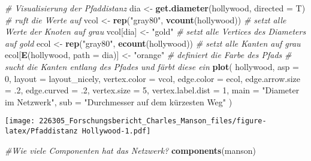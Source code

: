 \documentclass[
]{article}
\newenvironment{Shaded}{\begin{snugshade}}{\end{snugshade}}
\newcommand{\CommentTok}[1]{\textcolor[rgb]{0.56,0.35,0.01}{\textit{#1}}}
\newcommand{\DataTypeTok}[1]{\textcolor[rgb]{0.13,0.29,0.53}{#1}}
\newcommand{\DecValTok}[1]{\textcolor[rgb]{0.00,0.00,0.81}{#1}}
\newcommand{\FloatTok}[1]{\textcolor[rgb]{0.00,0.00,0.81}{#1}}
\newcommand{\KeywordTok}[1]{\textcolor[rgb]{0.13,0.29,0.53}{\textbf{#1}}}
\newcommand{\NormalTok}[1]{#1}
\newcommand{\StringTok}[1]{\textcolor[rgb]{0.31,0.60,0.02}{#1}}
\begin{document}
\begin{Shaded}
\begin{Highlighting}[]
\CommentTok{# Visualisierung der Pfaddistanz}
\NormalTok{dia <-}\StringTok{ }\KeywordTok{get.diameter}\NormalTok{(hollywood, }\DataTypeTok{directed =}\NormalTok{ T) }\CommentTok{# ruft die Werte auf}
\NormalTok{vcol <-}
\StringTok{  }\KeywordTok{rep}\NormalTok{(}\StringTok{"gray80"}\NormalTok{, }\KeywordTok{vcount}\NormalTok{(hollywood)) }\CommentTok{# setzt alle Werte der Knoten auf grau}
\NormalTok{vcol[dia] <-}\StringTok{ "gold"} \CommentTok{# setzt alle Vertices des Diameters auf gold}
\NormalTok{ecol <-}
\StringTok{  }\KeywordTok{rep}\NormalTok{(}\StringTok{"gray80"}\NormalTok{, }\KeywordTok{ecount}\NormalTok{(hollywood)) }\CommentTok{# setzt alle Kanten auf grau}
\NormalTok{ecol[}\KeywordTok{E}\NormalTok{(hollywood, }\DataTypeTok{path =}\NormalTok{ dia)] <-}
\StringTok{  "orange"} \CommentTok{# definiert die Farbe des Pfads}
\CommentTok{# sucht die Kanten entlang des Pfades und färbt diese ein}
\KeywordTok{plot}\NormalTok{(}
\NormalTok{  hollywood,}
  \DataTypeTok{asp =} \DecValTok{0}\NormalTok{,}
  \DataTypeTok{layout =}\NormalTok{ layout_nicely,}
  \DataTypeTok{vertex.color =}\NormalTok{ vcol,}
  \DataTypeTok{edge.color =}\NormalTok{ ecol,}
  \DataTypeTok{edge.arrow.size =} \FloatTok{.2}\NormalTok{,}
  \DataTypeTok{edge.curved =} \FloatTok{.2}\NormalTok{,}
  \DataTypeTok{vertex.size =} \DecValTok{5}\NormalTok{,}
  \DataTypeTok{vertex.label.dist =} \DecValTok{1}\NormalTok{,}
  \DataTypeTok{main =} \StringTok{"Diameter im Netzwerk"}\NormalTok{,}
  \DataTypeTok{sub =} \StringTok{"Durchmesser auf dem kürzesten Weg"}
\NormalTok{)}
\end{Highlighting}
\end{Shaded}

\texttt{[image: 226305\_Forschungsbericht\_Charles\_Manson\_files/figure-latex/Pfaddistanz Hollywood-1.pdf]}

\begin{Shaded}
\begin{Highlighting}[]
\CommentTok{#Wie    viele   Componenten hat das Netzwerk?}
\KeywordTok{components}\NormalTok{(manson)}
\end{Highlighting}
\end{Shaded}
\end{document}

